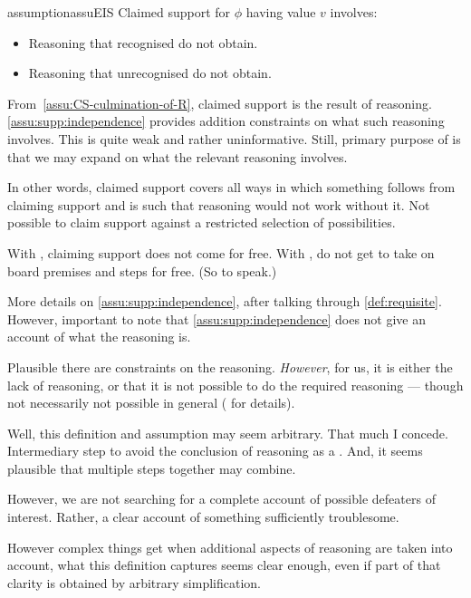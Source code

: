 \begin{note}
  \begin{restatable}[\eiS{-} --- \eiS{}]{assumption}{assuEIS}\label{assu:supp:independence}
    Claimed support for \(\phi\) having value \(v\) involves:
    \begin{itemize}
    \item Reasoning that recognised  do not obtain.
    \item Reasoning that unrecognised  do not obtain.
    \end{itemize}
    \vspace{-\baselineskip}
  \end{restatable}

  From~\autoref{assu:CS-culmination-of-R}, claimed support is the result of reasoning.
  \autoref{assu:supp:independence} provides addition constraints on what such reasoning involves.
  This is quite weak and rather uninformative.
  Still, primary purpose of \eiS{} is that we may expand on what the relevant reasoning involves.

  {\color{blue}
    In other words, claimed support covers all ways in which something follows from claiming support and is such that reasoning would not work without it.
    Not possible to claim support against a restricted selection of possibilities.
  }

  {\color{red}
    With \misled{}, claiming support does not come for free.
    With \mistaken{}, do not get to take on board premises and steps for free.
    (So to speak.)
  }

  More details on \autoref{assu:supp:independence}, after talking through \autoref{def:requisite}.
  However, important to note that \autoref{assu:supp:independence} does not give an account of what the reasoning is.

  Plausible there are constraints on the reasoning.
  \emph{However}, for us, it is either the lack of reasoning, or that it is not possible to do the required reasoning --- though not necessarily not possible in general (\nI{} for details).
\end{note}

\begin{note}
  Well, this definition and assumption may seem arbitrary.
  That much I concede.
  Intermediary step to avoid the conclusion of reasoning as a \requ{}.
  And, it seems plausible that multiple steps together may combine.

  However, we are not searching for a complete account of possible defeaters of interest.
  Rather, a clear account of something sufficiently troublesome.

  However complex things get when additional aspects of reasoning are taken into account, what this definition captures seems clear enough, even if part of that clarity is obtained by arbitrary simplification.
\end{note}

